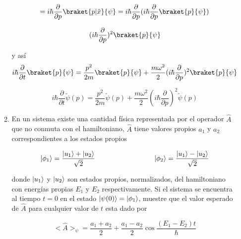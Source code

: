\documentclass[12pt,a4paper]{article}
\DeclarePairedDelimiter\ket{\lvert}{\rangle}
\begin{document}
\begin{enumerate}
\begin{enumerate}
    \begin{equation*}
        = i \hbar \frac{\partial}{\partial p} \braket{p|\hat{x}}{\psi} = i \hbar \frac{\partial}{\partial p} (i \hbar \frac{\partial}{\partial p} \braket{p}{\psi})
    \end{equation*}
    
    \begin{equation*}
        (i \hbar \frac{\partial}{\partial p})^2 \braket{p}{\psi}
    \end{equation*}
    
    y así
    \begin{equation*}
    i\hbar \frac{\partial}{\partial t} \braket{p}{\psi} = \frac{p^2}{2m} \braket{p}{\psi} + \frac{m \omega^2}{2} (i \hbar \frac{\partial}{\partial p})^2 \braket{p}{\psi}
    \end{equation*}
    
    \begin{equation*}
        i\hbar \frac{\partial}{\partial t} \tilde{\psi}(p) = \frac{p^2}{2m} \tilde{\psi}(p) + \frac{m \omega^2}{2} (i \hbar \frac{\partial}{\partial p})^2 \tilde{\psi}(p)
    \end{equation*}
    
    
    
    
    
    \item En un sistema existe una cantidad física representada por el operador $\hat{A}$ que no conmuta con el hamiltoniano, $\hat{A}$ tiene valores propios $a_1$ y $a_2$ correspondientes a los estados propios
    
    \begin{equation*}
        \ket{\phi_1} = \frac{\ket{u_1} + \ket{u_2}}{\sqrt{2}} \hspace{3cm} \ket{\phi_2} = \frac{\ket{u_1} - \ket{u_2}}{\sqrt{2}}
    \end{equation*}
    
    donde $\ket{u_1}$ y $\ket{u_2}$ son estados propios, normalizados, del hamiltoniano con energías propias $E_1$ y $E_2$ respectivamente. Si el sistema se encuentra al tiempo $t =0$ en el estado $\ket{\psi (0)} = \ket{\phi_1}$, muestre que el valor esperado de $\hat{A}$ para cualquier valor de $t$ esta dado por
    
    \begin{equation*}
        <\hat{A}>_{\psi} = \frac{a_1 + a_2}{2} + \frac{a_1 - a_2}{2} \cos{\frac{(E_1 - E_2)t}{\hbar}}
    \end{equation*}
    

\end{enumerate}
\end{enumerate}
\end{document}
